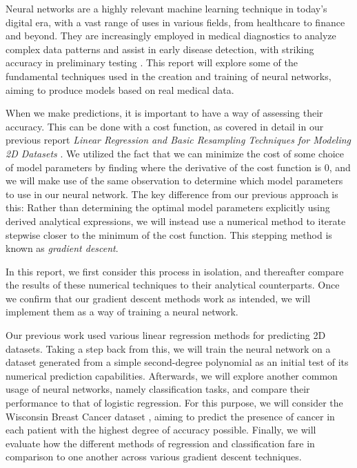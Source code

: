 
Neural networks are a highly relevant machine learning technique in today's digital era, with a vast range of uses in various fields, from healthcare to finance and beyond. They are increasingly employed in medical diagnostics to analyze complex data patterns and assist in early disease detection, with striking accuracy in preliminary testing \cite{ZELTZER2023480}. This report will explore some of the fundamental techniques used in the creation and training of neural networks, aiming to produce models based on real medical data.

When we make predictions, it is important to have a way of assessing their accuracy. This can be done with a cost function, as covered in detail in our previous report \emph{Linear Regression and Basic Resampling Techniques for Modeling 2D Datasets} \cite{fysstkproject1}. We utilized the fact that we can minimize the cost of some choice of model parameters by finding where the derivative of the cost function is 0, and we will make use of the same observation to determine which model parameters to use in our neural network. The key difference from our previous approach is this: Rather than determining the optimal model parameters explicitly using derived analytical expressions, we will instead use a numerical method to iterate stepwise closer to the minimum of the cost function. This stepping method is known as \emph{gradient descent}. 

In this report, we first consider this process in isolation, and thereafter compare the results of these numerical techniques to their analytical counterparts. Once we confirm that our gradient descent methods work as intended, we will implement them as a way of training a neural network.

Our previous work used various linear regression methods for predicting 2D datasets. Taking a step back from this, we will train the neural network on a dataset generated from a simple second-degree polynomial as an initial test of its numerical prediction capabilities. Afterwards, we will explore another common usage of neural networks, namely classification tasks, and compare their performance to that of logistic regression. For this purpose, we will consider the Wisconsin Breast Cancer dataset \cite{sklearnBreastCancerData}, aiming to predict the presence of cancer in each patient with the highest degree of accuracy possible. Finally, we will evaluate how the different methods of regression and classification fare in comparison to one another across various gradient descent techniques.

